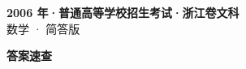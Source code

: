 \documentclass[zihao=-4, a4paper]{ctexart}
\begin{document}
\begin{center}
  {\Large\bfseries 2006 年·普通高等学校招生考试·浙江卷文科}\\[4pt]
  {\large 数学 · 简答版}
\end{center}
\medskip
{}

\clearpage
{}
\begin{center}{\Large\bfseries 答案速查}\end{center}
\medskip

\end{document}

